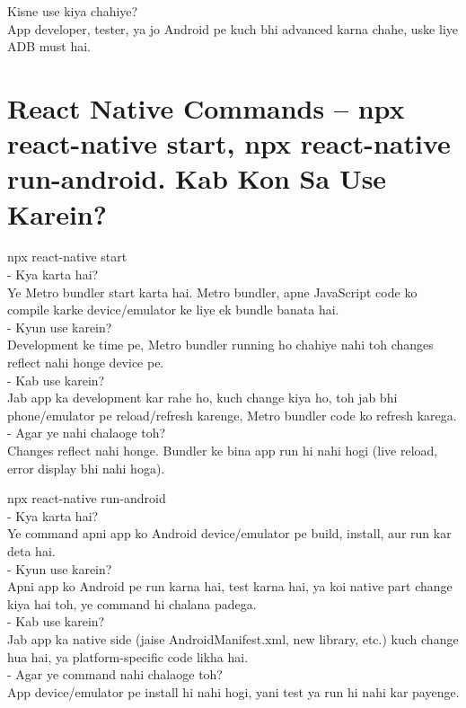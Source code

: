 \documentclass[a4paper]{article}
\newcommand\imp[1]{{\color{ImportantRed}#1}}
\begin{document}
\imp{Kisne use kiya chahiye?}\\
App developer, tester, ya jo Android pe kuch bhi advanced karna chahe, uske liye ADB must hai.

\vspace{1em}
\section*{React Native Commands – npx react-native start, npx react-native run-android. Kab Kon Sa Use Karein?}
\imp{npx react-native start}\\
- \imp{Kya karta hai?}\\
  Ye \imp{Metro bundler} start karta hai. Metro bundler, apne JavaScript code ko compile karke device/emulator ke liye ek bundle banata hai.\\
- \imp{Kyun use karein?}\\
  Development ke time pe, Metro bundler running ho chahiye nahi toh changes reflect nahi honge device pe.\\
- \imp{Kab use karein?}\\
  Jab app ka development kar rahe ho, kuch change kiya ho, toh jab bhi phone/emulator pe reload/refresh karenge, Metro bundler code ko refresh karega.\\
- \imp{Agar ye nahi chalaoge toh?}\\
  Changes reflect nahi honge. Bundler ke bina app run hi nahi hogi (live reload, error display bhi nahi hoga).

\imp{npx react-native run-android}\\
- \imp{Kya karta hai?}\\
  Ye command apni app ko \imp{Android device/emulator} pe build, install, aur run kar deta hai.\\
- \imp{Kyun use karein?}\\
  Apni app ko Android pe run karna hai, test karna hai, ya koi native part change kiya hai toh, ye command hi chalana padega.\\
- \imp{Kab use karein?}\\
  Jab app ka native side (jaise AndroidManifest.xml, new library, etc.) kuch change hua hai, ya platform-specific code likha hai.\\
- \imp{Agar ye command nahi chalaoge toh?}\\
  App device/emulator pe install hi nahi hogi, yani test ya run hi nahi kar payenge.

\vspace{1em}
\end{document}
